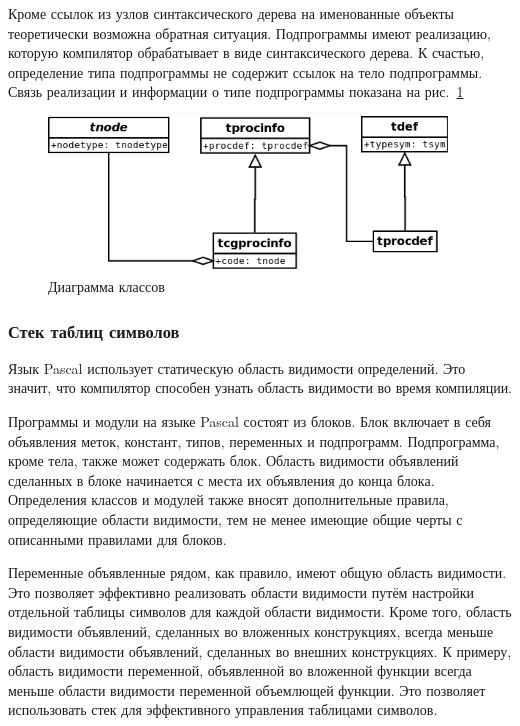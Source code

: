 \documentclass{imcs}
\begin{document}
Кроме ссылок из узлов синтаксического дерева на именованные объекты теоретически возможна обратная
ситуация. Подпрограммы имеют реализацию, которую компилятор обрабатывает в виде синтаксического
дерева. К счастью, определение типа подпрограммы не содержит ссылок на тело подпрограммы. Связь
реализации и информации о типе подпрограммы показана на рис.~\ref{tprocinfo}

\begin{figure}[htb]
\centering
\includegraphics[width=400px]{./uml/tprocinfo.png}
\caption{Диаграмма классов}
\label{tprocinfo}
\end{figure}

\subsubsection{Стек таблиц символов}

Язык Pascal использует статическую область видимости определений. Это значит, что компилятор
способен узнать область видимости во время компиляции.

Программы и модули на языке Pascal состоят из блоков.
Блок включает в себя объявления меток, констант, типов, переменных и подпрограмм.
Подпрограмма, кроме тела, также может содержать блок. Область видимости объявлений сделанных в блоке
начинается с места их объявления до конца блока\cite{refguide}.
Определения классов и модулей также вносят дополнительные
правила, определяющие области видимости, тем не менее имеющие общие черты с описанными правилами для блоков.

Переменные объявленные рядом, как правило, имеют общую область видимости. 
Это позволяет эффективно реализовать области видимости
путём настройки отдельной таблицы символов для каждой области видимости\cite{dragonbook}. 
Кроме того, область видимости
объявлений, сделанных во вложенных конструкциях, всегда меньше области видимости объявлений, сделанных
во внешних конструкциях. К примеру, область видимости переменной, объявленной во вложенной функции 
всегда меньше области видимости переменной объемлющей функции. Это позволяет использовать стек для
эффективного управления таблицами символов. 
\end{document}
